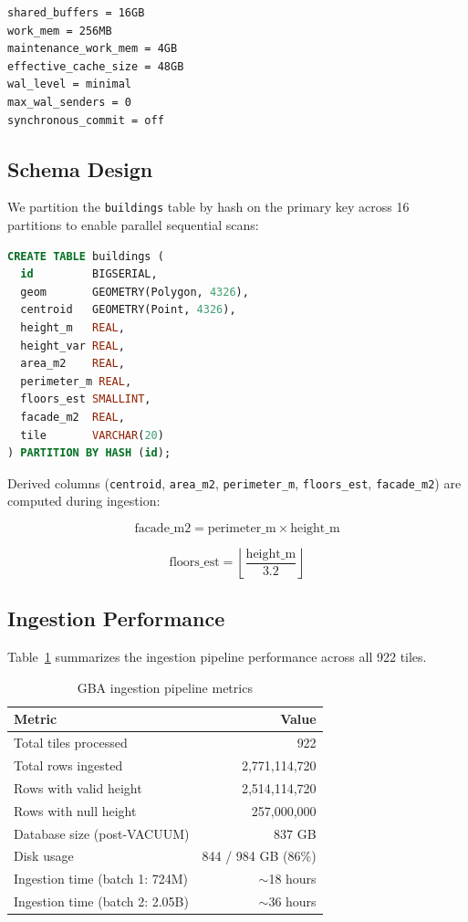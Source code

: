 \documentclass[10pt,twocolumn]{article}
\begin{document}
\begin{lstlisting}
shared_buffers = 16GB
work_mem = 256MB
maintenance_work_mem = 4GB
effective_cache_size = 48GB
wal_level = minimal
max_wal_senders = 0
synchronous_commit = off
\end{lstlisting}

\subsection{Schema Design}

We partition the \texttt{buildings} table by hash on the primary key across 16 partitions to enable parallel sequential scans:

\begin{lstlisting}[language=SQL]
CREATE TABLE buildings (
  id         BIGSERIAL,
  geom       GEOMETRY(Polygon, 4326),
  centroid   GEOMETRY(Point, 4326),
  height_m   REAL,
  height_var REAL,
  area_m2    REAL,
  perimeter_m REAL,
  floors_est SMALLINT,
  facade_m2  REAL,
  tile       VARCHAR(20)
) PARTITION BY HASH (id);
\end{lstlisting}

Derived columns (\texttt{centroid}, \texttt{area\_m2}, \texttt{perimeter\_m}, \texttt{floors\_est}, \texttt{facade\_m2}) are computed during ingestion:

\begin{equation}
  \text{facade\_m2} = \text{perimeter\_m} \times \text{height\_m}
  \label{eq:facade}
\end{equation}

\begin{equation}
  \text{floors\_est} = \left\lfloor \frac{\text{height\_m}}{3.2} \right\rfloor
  \label{eq:floors}
\end{equation}

\subsection{Ingestion Performance}

Table~\ref{tab:ingestion} summarizes the ingestion pipeline performance across all 922 tiles.

\begin{table}[h]
\centering
\caption{GBA ingestion pipeline metrics}
\label{tab:ingestion}
\begin{tabular}{lr}
\toprule
\textbf{Metric} & \textbf{Value} \\
\midrule
Total tiles processed & 922 \\
Total rows ingested & 2,771,114,720 \\
Rows with valid height & 2,514,114,720 \\
Rows with null height & 257,000,000 \\
Database size (post-VACUUM) & 837 GB \\
Disk usage & 844 / 984 GB (86\%) \\
Ingestion time (batch 1: 724M) & $\sim$18 hours \\
Ingestion time (batch 2: 2.05B) & $\sim$36 hours \\
\bottomrule
\end{tabular}
\end{table}
\end{document}
